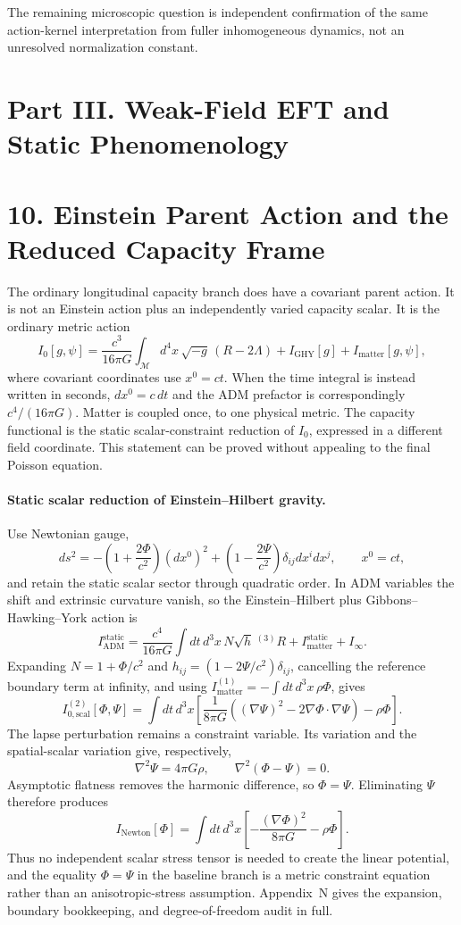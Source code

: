 \documentclass[11pt]{article}
\begin{document}
The remaining microscopic question is independent confirmation of the same action-kernel interpretation from fuller inhomogeneous dynamics, not an unresolved normalization constant.
\section*{Part III. Weak-Field EFT and Static Phenomenology}

\section{10. Einstein Parent Action and the Reduced Capacity Frame}

The ordinary longitudinal capacity branch does have a covariant parent action. It is not an Einstein action plus an independently varied capacity scalar. It is the ordinary metric action
\[
I_{0}[g,\psi]
=
\frac{c^3}{16\pi G}\int_{\mathcal M}d^4x\,\sqrt{-g}\,(R-2\Lambda)
+I_{\mathrm{GHY}}[g]
+I_{\mathrm{matter}}[g,\psi],
\]
where covariant coordinates use $x^0=ct$. When the time integral is instead written in seconds, $dx^0=c\,dt$ and the ADM prefactor is correspondingly $c^4/(16\pi G)$. Matter is coupled once, to one physical metric. The capacity functional is the static scalar-constraint reduction of $I_0$, expressed in a different field coordinate. This statement can be proved without appealing to the final Poisson equation.

\paragraph{Static scalar reduction of Einstein--Hilbert gravity.}
Use Newtonian gauge,
\[
ds^2
=-\left(1+\frac{2\Phi}{c^2}\right)(dx^0)^2
+\left(1-\frac{2\Psi}{c^2}\right)\delta_{ij}dx^idx^j,
\qquad x^0=ct,
\]
and retain the static scalar sector through quadratic order. In ADM variables \citep{ADM1962} the shift and extrinsic curvature vanish, so the Einstein--Hilbert plus Gibbons--Hawking--York action is
\[
I_{\mathrm{ADM}}^{\mathrm{static}}
=\frac{c^4}{16\pi G}\int dt\,d^3x\,N\sqrt h\,{}^{(3)}R
+I_{\mathrm{matter}}^{\mathrm{static}}
+I_\infty.
\]
Expanding $N=1+\Phi/c^2$ and $h_{ij}=(1-2\Psi/c^2)\delta_{ij}$, cancelling the reference boundary term at infinity, and using $I_{\mathrm{matter}}^{(1)}=-\int dt\,d^3x\,\rho\Phi$, gives
\[
I_{0,\mathrm{scal}}^{(2)}[\Phi,\Psi]
=
\int dt\,d^3x
\left[
\frac{1}{8\pi G}
\left((\nabla\Psi)^2-2\nabla\Phi\!\cdot\!\nabla\Psi\right)
-\rho\Phi
\right].
\]
The lapse perturbation remains a constraint variable. Its variation and the spatial-scalar variation give, respectively,
\[
\nabla^2\Psi=4\pi G\rho,
\qquad
\nabla^2(\Phi-\Psi)=0.
\]
Asymptotic flatness removes the harmonic difference, so $\Phi=\Psi$. Eliminating $\Psi$ therefore produces
\[
\boxed{
I_{\mathrm{Newton}}[\Phi]
=
\int dt\,d^3x
\left[
-\frac{(\nabla\Phi)^2}{8\pi G}
-\rho\Phi
\right].
}
\]
Thus no independent scalar stress tensor is needed to create the linear potential, and the equality $\Phi=\Psi$ in the baseline branch is a metric constraint equation rather than an anisotropic-stress assumption. Appendix~N gives the expansion, boundary bookkeeping, and degree-of-freedom audit in full.
\end{document}
